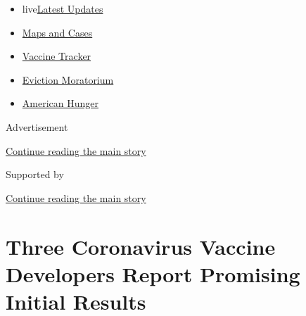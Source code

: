 \begin{itemize}
\tightlist
\item
  live\href{https://www.nytimes3xbfgragh.onion/2020/09/05/world/coronavirus-covid.html?name=styln-coronavirus-national\&region=TOP_BANNER\&block=storyline_menu_recirc\&action=click\&pgtype=Article\&impression_id=8258e1c0-efba-11ea-91a0-1f980cab72d5\&variant=undefined}{Latest
  Updates}
\item
  \href{https://www.nytimes3xbfgragh.onion/interactive/2020/us/coronavirus-us-cases.html?name=styln-coronavirus-national\&region=TOP_BANNER\&block=storyline_menu_recirc\&action=click\&pgtype=Article\&impression_id=8258e1c1-efba-11ea-91a0-1f980cab72d5\&variant=undefined}{Maps
  and Cases}
\item
  \href{https://www.nytimes3xbfgragh.onion/interactive/2020/science/coronavirus-vaccine-tracker.html?name=styln-coronavirus-national\&region=TOP_BANNER\&block=storyline_menu_recirc\&action=click\&pgtype=Article\&impression_id=8258e1c2-efba-11ea-91a0-1f980cab72d5\&variant=undefined}{Vaccine
  Tracker}
\item
  \href{https://www.nytimes3xbfgragh.onion/2020/09/02/your-money/eviction-moratorium-covid.html?name=styln-coronavirus-national\&region=TOP_BANNER\&block=storyline_menu_recirc\&action=click\&pgtype=Article\&impression_id=8258e1c3-efba-11ea-91a0-1f980cab72d5\&variant=undefined}{Eviction
  Moratorium}
\item
  \href{https://www.nytimes3xbfgragh.onion/interactive/2020/09/02/magazine/food-insecurity-hunger-us.html?name=styln-coronavirus-national\&region=TOP_BANNER\&block=storyline_menu_recirc\&action=click\&pgtype=Article\&impression_id=8258e1c4-efba-11ea-91a0-1f980cab72d5\&variant=undefined}{American
  Hunger}
\end{itemize}

Advertisement

\protect\hyperlink{after-top}{Continue reading the main story}

Supported by

\protect\hyperlink{after-sponsor}{Continue reading the main story}

\hypertarget{three-coronavirus-vaccine-developers-report-promising-initial-results}{%
\section{Three Coronavirus Vaccine Developers Report Promising Initial
Results}\label{three-coronavirus-vaccine-developers-report-promising-initial-results}}

